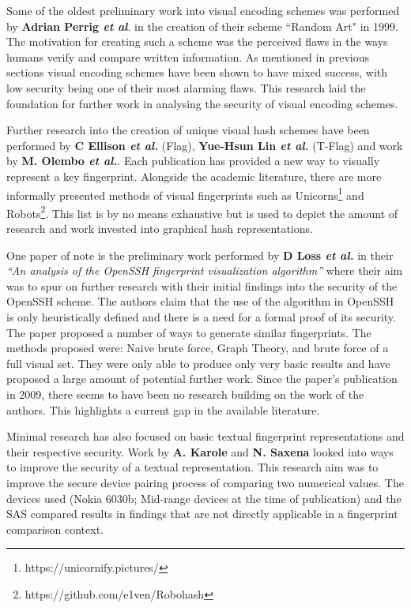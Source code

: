 Some of the oldest preliminary work into visual encoding schemes was performed by \textbf{Adrian Perrig \textit{et al}}\cite{perrig1999hash}. in the creation of their scheme ``Random Art" in 1999. The motivation for creating such a scheme was the perceived flaws in the ways humans verify and compare written information. As mentioned in previous sections visual encoding schemes have been shown to have mixed success, with low security being one of their most alarming flaws. This research laid the foundation for further work in analysing the security of visual encoding schemes.

Further research into the creation of unique visual hash schemes have been performed by \textbf{C Ellison \textit{et al.}} \cite{ellison2003public} (Flag), \textbf{Yue-Hsun Lin \textit{et al.}}\cite{lin2010spate} (T-Flag) and work by \textbf{M.  Olembo \textit{et al.}}\cite{olembo2013developing}. Each publication has provided a new way to visually represent a key fingerprint. Alongside the academic literature, there are more informally presented methods of visual fingerprints such as Unicorns\footnote{https://unicornify.pictures/} and Robots\footnote{https://github.com/e1ven/Robohash}. This list is by no means exhaustive but is used to depict the amount of research and work invested into graphical hash representations.

One paper of note is the preliminary work performed by \textbf{D Loss \textit{et al.}}\cite{loss2009drunken} in their \textit{``An analysis of the OpenSSH fingerprint visualization algorithm''} where their aim was to spur on further research with their initial findings into the security of the OpenSSH scheme. The authors claim that the use of the algorithm in OpenSSH is only heuristically defined and there is a need for a formal proof of its security. \\
The paper proposed a number of ways to generate similar fingerprints. The methods proposed were: Naive brute force, Graph Theory, and brute force of a full visual set. They were only able to produce only very basic results and have proposed a large amount of potential further work. Since the paper's publication in 2009, there seems to have been no research building on the work of the authors. This highlights a current gap in the available literature.

Minimal research has also focused on basic textual fingerprint representations and their respective security. Work by \textbf{A. Karole} and \textbf{N. Saxena}\cite{karole2009improving} looked into ways to improve the security of a textual representation. This research aim was to improve the secure device pairing process of comparing two numerical values. The devices used (Nokia 6030b; Mid-range devices at the time of publication) and the SAS compared results in findings that are not directly applicable in a fingerprint comparison context. 


